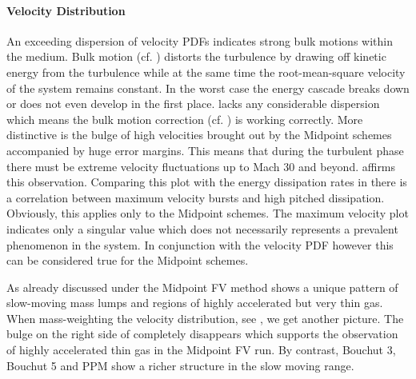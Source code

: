 \paragraph{Velocity Distribution}
An exceeding dispersion of velocity PDFs indicates strong bulk motions within
the medium. Bulk motion (cf. ) distorts the turbulence by
drawing off kinetic energy from the turbulence while at the same time the
root-mean-square velocity of the system remains constant. In the worst case the
energy cascade breaks down or does not even develop in the first place.
 lacks any considerable
dispersion which means the bulk motion correction (cf.
) is working correctly. More distinctive is
the bulge of high velocities brought out by the Midpoint schemes
accompanied by huge error margins. This means that during the turbulent phase
there must be extreme velocity fluctuations up to Mach 30 and beyond.
 affirms this observation.
Comparing this plot with the energy dissipation rates in
 there is a correlation
between maximum velocity bursts and high pitched dissipation. Obviously, this
applies only to the Midpoint schemes. The maximum velocity plot indicates only
a singular value which does not necessarily represents a prevalent phenomenon in
the system. In conjunction with the velocity PDF however this can be considered
true for the Midpoint schemes.

As already discussed under  the Midpoint FV method
shows a unique pattern of slow-moving mass lumps and regions of highly
accelerated but very thin gas. When mass-weighting the velocity distribution,
see , we get another picture.
The bulge on the right side of 
completely disappears which supports the observation of highly accelerated thin
gas in the Midpoint FV run. By contrast, Bouchut 3, Bouchut 5 and PPM show
a richer structure in the slow moving range.

